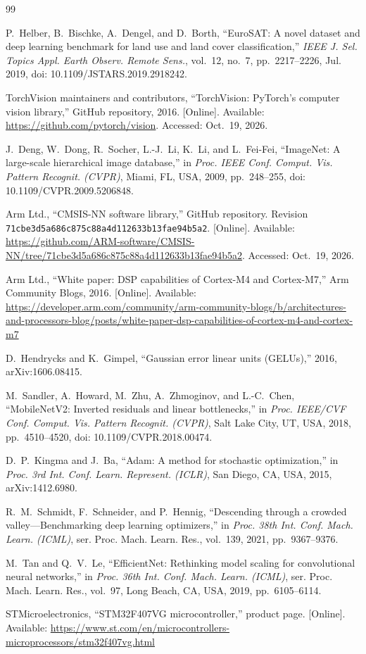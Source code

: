 \begin{thebibliography}{99}

P.~Helber, B.~Bischke, A.~Dengel, and D.~Borth, ``EuroSAT: A novel dataset
and deep learning benchmark for land use and land cover classification,''
\emph{IEEE J. Sel. Topics Appl. Earth Observ. Remote Sens.}, vol.~12, no.~7,
pp.~2217--2226, Jul. 2019, doi: 10.1109/JSTARS.2019.2918242.

TorchVision maintainers and contributors, ``TorchVision: PyTorch's computer
vision library,'' GitHub repository, 2016. [Online]. Available:
\url{https://github.com/pytorch/vision}. Accessed: Oct.~19, 2026.

J.~Deng, W.~Dong, R.~Socher, L.-J.~Li, K.~Li, and L.~Fei-Fei, ``ImageNet: A
large-scale hierarchical image database,'' in \emph{Proc. IEEE Conf. Comput.
Vis. Pattern Recognit. (CVPR)}, Miami, FL, USA, 2009, pp.~248--255,
doi: 10.1109/CVPR.2009.5206848.

Arm Ltd., ``CMSIS-NN software library,'' GitHub repository.
Revision \texttt{71cbe3d5a686c875c88a4d112633b13fae94b5a2}. [Online].
Available: \url{https://github.com/ARM-software/CMSIS-NN/tree/71cbe3d5a686c875c88a4d112633b13fae94b5a2}.
Accessed:
Oct.~19, 2026.

Arm Ltd., ``White paper: DSP capabilities of Cortex-M4 and Cortex-M7,'' Arm
Community Blogs, 2016. [Online]. Available:
\url{https://developer.arm.com/community/arm-community-blogs/b/architectures-and-processors-blog/posts/white-paper-dsp-capabilities-of-cortex-m4-and-cortex-m7}

D.~Hendrycks and K.~Gimpel, ``Gaussian error linear units (GELUs),'' 2016,
arXiv:1606.08415.

M.~Sandler, A.~Howard, M.~Zhu, A.~Zhmoginov, and L.-C.~Chen, ``MobileNetV2:
Inverted residuals and linear bottlenecks,'' in \emph{Proc. IEEE/CVF Conf.
Comput. Vis. Pattern Recognit. (CVPR)}, Salt Lake City, UT, USA, 2018,
pp.~4510--4520, doi: 10.1109/CVPR.2018.00474.

D.~P.~Kingma and J.~Ba, ``Adam: A method for stochastic optimization,'' in
\emph{Proc. 3rd Int. Conf. Learn. Represent. (ICLR)}, San Diego, CA, USA,
2015, arXiv:1412.6980.

R.~M.~Schmidt, F.~Schneider, and P.~Hennig, ``Descending through a crowded
valley---Benchmarking deep learning optimizers,'' in \emph{Proc. 38th Int.
Conf. Mach. Learn. (ICML)}, ser. Proc. Mach. Learn. Res., vol.~139, 2021,
pp.~9367--9376.

M.~Tan and Q.~V.~Le, ``EfficientNet: Rethinking model scaling for
convolutional neural networks,'' in \emph{Proc. 36th Int. Conf. Mach. Learn.
(ICML)}, ser. Proc. Mach. Learn. Res., vol.~97, Long Beach, CA, USA, 2019,
pp.~6105--6114.

STMicroelectronics, ``STM32F407VG microcontroller,'' product page. [Online].
Available:
\url{https://www.st.com/en/microcontrollers-microprocessors/stm32f407vg.html}

\end{thebibliography}
